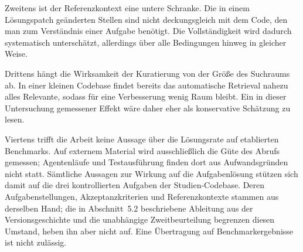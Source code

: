 Zweitens ist der Referenzkontext eine untere Schranke. Die in einem Lösungspatch geänderten Stellen sind nicht deckungsgleich mit dem Code, den man zum Verständnis einer Aufgabe benötigt. Die Vollständigkeit wird dadurch systematisch unterschätzt, allerdings über alle Bedingungen hinweg in gleicher Weise.

Drittens hängt die Wirksamkeit der Kuratierung von der Größe des Suchraums ab. In einer kleinen Codebase findet bereits das automatische Retrieval nahezu alles Relevante, sodass für eine Verbesserung wenig Raum bleibt. Ein in dieser Untersuchung gemessener Effekt wäre daher eher als konservative Schätzung zu lesen.

Viertens trifft die Arbeit keine Aussage über die Lösungsrate auf etablierten Benchmarks. Auf externem Material wird ausschließlich die Güte des Abrufs gemessen; Agentenläufe und Testausführung finden dort aus Aufwandsgründen nicht statt. Sämtliche Aussagen zur Wirkung auf die Aufgabenlösung stützen sich damit auf die drei kontrollierten Aufgaben der Studien-Codebase. Deren Aufgabenstellungen, Akzeptanzkriterien und Referenzkontexte stammen aus derselben Hand; die in Abschnitt~5.2 beschriebene Ableitung aus der Versionsgeschichte und die unabhängige Zweitbeurteilung begrenzen diesen Umstand, heben ihn aber nicht auf. Eine Übertragung auf Benchmarkergebnisse ist nicht zulässig.
